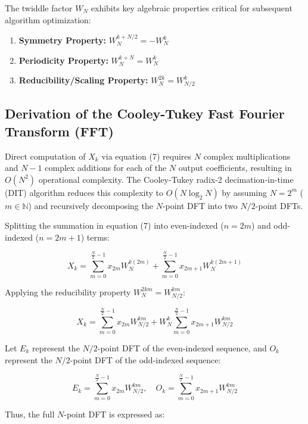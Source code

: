 \documentclass[11pt,a4paper]{article}
\begin{document}
The twiddle factor $W_N$ exhibits key algebraic properties critical for subsequent algorithm optimization:
\begin{enumerate}
    \item \textbf{Symmetry Property:} $W_N^{k + N/2} = -W_N^k$
    \item \textbf{Periodicity Property:} $W_N^{k + N} = W_N^k$
    \item \textbf{Reducibility/Scaling Property:} $W_N^{2k} = W_{N/2}^k$
\end{enumerate}

\subsection{Derivation of the Cooley-Tukey Fast Fourier Transform (FFT)}

Direct computation of $X_k$ via equation (7) requires $N$ complex multiplications and $N-1$ complex additions for each of the $N$ output coefficients, resulting in $O(N^2)$ operational complexity. The Cooley-Tukey radix-2 decimation-in-time (DIT) algorithm reduces this complexity to $O(N \log_2 N)$ by assuming $N = 2^m$ ($m \in \mathbb{N}$) and recursively decomposing the $N$-point DFT into two $N/2$-point DFTs.

Splitting the summation in equation (7) into even-indexed ($n = 2m$) and odd-indexed ($n = 2m+1$) terms:

\begin{equation}
X_k = \sum_{m=0}^{\frac{N}{2}-1} x_{2m} W_N^{k(2m)} + \sum_{m=0}^{\frac{N}{2}-1} x_{2m+1} W_N^{k(2m+1)}
\end{equation}

Applying the reducibility property $W_N^{2km} = W_{N/2}^{km}$:

\begin{equation}
X_k = \sum_{m=0}^{\frac{N}{2}-1} x_{2m} W_{N/2}^{km} + W_N^k \sum_{m=0}^{\frac{N}{2}-1} x_{2m+1} W_{N/2}^{km}
\end{equation}

Let $E_k$ represent the $N/2$-point DFT of the even-indexed sequence, and $O_k$ represent the $N/2$-point DFT of the odd-indexed sequence:

\begin{equation}
E_k = \sum_{m=0}^{\frac{N}{2}-1} x_{2m} W_{N/2}^{km}, \quad O_k = \sum_{m=0}^{\frac{N}{2}-1} x_{2m+1} W_{N/2}^{km}
\end{equation}

Thus, the full $N$-point DFT is expressed as:
\end{document}
